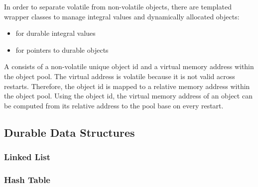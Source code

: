 In order to separate volatile from non-volatile objects, there are templated wrapper classes to manage integral values and dynamically allocated objects:

\begin{itemize}
    \item {} for durable integral values
    \item {} for pointers to durable objects
\end{itemize}

A  consists of a non-volatile unique object id and a virtual memory address within the object pool. The virtual address is volatile because it is not valid across restarts. Therefore, the object id is mapped to a relative memory address within the object pool. Using the object id, the virtual memory address of an object can be computed from its relative address to the pool base on every restart.



\subsection{Durable Data Structures}
\label{ch:impl-data}

\subsubsection{Linked List}

\subsubsection{Hash Table}


